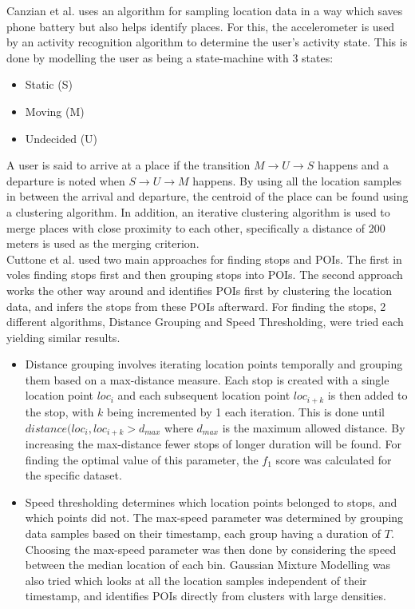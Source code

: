 Canzian et al. uses an algorithm for sampling location data in a way which saves phone battery but also helps identify places. For this, the accelerometer is used by an activity recognition algorithm to determine the user's activity state. This is done by modelling the user as being a state-machine with 3 states: 
\begin{itemize}
    \item Static (S)
    \item Moving (M)
    \item Undecided (U)
\end{itemize}

A user is said to arrive at a place if the transition $M \rightarrow U \rightarrow S$ happens and a departure is noted when $S \rightarrow U \rightarrow M$ happens. By using all the location samples in between the arrival and departure, the centroid of the place can be found using a clustering algorithm. In addition, an iterative clustering algorithm is used to merge places with close proximity to each other, specifically a distance of 200 meters is used as the merging criterion. \\ 


Cuttone et al. used two main approaches for finding stops and POIs. The first in voles finding stops first and then grouping stops into POIs. The second approach works the other way around and identifies POIs first by clustering the location data, and infers the stops from these POIs afterward. For finding the stops, 2 different algorithms, Distance Grouping and Speed Thresholding, were tried each yielding similar results.

\begin{itemize}
    \item Distance grouping involves iterating location points temporally and grouping them based on a max-distance measure. Each stop is created with a single location point $loc_{i}$ and each subsequent location point $loc_{i+k}$ is then added to the stop, with $k$ being incremented by 1 each iteration. This is done until $distance(loc_{i}, loc_{i+k} > d_{max}$ where $d_{max}$ is the maximum allowed distance. By increasing the max-distance fewer stops of longer duration will be found. For finding the optimal value of this parameter, the $f_1$ score was calculated for the specific dataset.  

    \item Speed thresholding determines which location points belonged to stops, and which points did not. The max-speed parameter was determined by grouping data samples based on their timestamp, each group having a duration of $T$. Choosing the max-speed parameter was then done by considering the speed between the median location of each bin. Gaussian Mixture Modelling was also tried which looks at all the location samples independent of their timestamp, and identifies POIs directly from clusters with large densities. 
\end{itemize}

